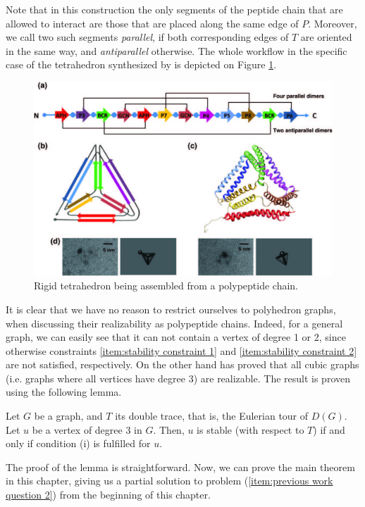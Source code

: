 \documentclass[12pt,a4paper,titlepage,openany]{report}
\begin{document}
Note that in this construction the only segments of the peptide chain that are allowed to interact are those that are placed along the same edge of $P$. Moreover, we call two such segments \emph{parallel}, if both corresponding edges of $T$ are oriented in the same way, and \emph{antiparallel} otherwise.
The whole workflow in the specific case of the tetrahedron synthesized by \cite{gradivsar2013design} is depicted on Figure \ref{fig:Tetrahedron process}. 

\begin{figure}[h]
	\centering
	\includegraphics[width=0.8\linewidth]{tetrahedron_process}
	\caption{Rigid tetrahedron being assembled from a polypeptide chain.}
	\label{fig:Tetrahedron process}
\end{figure}

It is clear that we have no reason to restrict ourselves to polyhedron graphs, when discussing their realizability as polypeptide chains. Indeed, for a general graph, we can easily see that it can not contain a vertex of degree 1 or 2, since otherwise constraints \ref{item:stability constraint 1} and \ref{item:stability constraint 2} are not satisfied, respectively. On the other hand \cite{gradivsar2013design} has proved that all cubic graphs (i.e. graphs where all vertices have degree 3) are realizable. The result is proven using the following lemma.

\begin{lemma}
	\label{lemma: cubic}
	Let $G$ be a graph, and $T$ its double trace, that is, the Eulerian tour of $D(G)$. Let $u$ be a vertex of degree 3 in $G$. Then, $u$ is stable (with respect to $T$) if and only if condition (i) is fulfilled for $u$.
\end{lemma}

The proof of the lemma is straightforward. Now, we can prove the main theorem in this chapter, giving us a partial solution to problem (\ref{item:previous work question 2}) from the beginning of this chapter.
\end{document}
